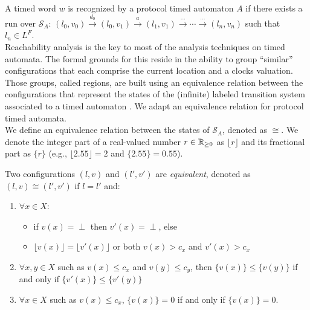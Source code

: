 A timed word $w$ is recognized by a protocol timed automaton $A$ if there exists a run over $\mathcal{S}_A$: $(l_0, v_0) \stackrel{d_0}{\longrightarrow} (l_0, v_1) \stackrel{a}{\longrightarrow} (l_1, v_1) \stackrel{\cdots}{\longrightarrow} \cdots \stackrel{\cdots}{\longrightarrow} (l_n, v_n)$ such that $l_n \in L^F$.\\

Reachability analysis is the key to most of the analysis techniques on timed automata. The formal grounds for this reside in the ability to group ``similar'' configurations that each comprise the current location and a clocks valuation. Those groups, called regions, are built using an equivalence relation between the configurations that represent the states of the (infinite) labeled transition system associated to a timed automaton \cite{RADLD94}. We adapt an equivalence relation for protocol timed automata.\\

We define an equivalence relation between the states of $\mathcal{S}_A$, denoted as $\cong$. We denote the integer part of a real-valued number $r \in \mathbb{R}_{\geq 0}$ as $\lfloor r \rfloor$ and its fractional part as $\{ r \}$ (e.g., $\lfloor 2.55 \rfloor = 2$ and $\{ 2.55 \} = 0.55$).

\begin{definition}
Two configurations $(l, v)$ and $(l', v')$ are \emph{equivalent}, denoted as $(l, v) \cong (l', v')$ if $l = l'$ and:
\begin{enumerate}
  
  \item $\forall x \in X$:
  \begin{itemize}
    \item if $v(x) = \perp$ then $v'(x) = \perp$, else
    \item $\lfloor v(x) \rfloor = \lfloor v'(x) \rfloor$ or both $v(x) > c_x$ and $v'(x) > c_x$
  \end{itemize}
  
   \item $\forall x,y \in X$ such as $v(x) \leq c_x$ and $v(y) \leq c_y$, then $\{v(x)\} \leq \{v(y)\}$ if and only if $\{v'(x)\} \leq \{v'(y)\}$

  \item $\forall x \in X$ such as $v(x) \leq c_x$, $\{v(x)\} = 0$ if and only if $\{v(x)\} = 0$.
  
\end{enumerate}
\end{definition}

